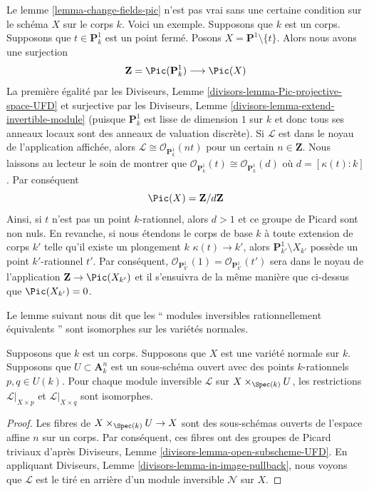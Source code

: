 \begin{example}
\label{example-need-condition}
Le lemme \ref{lemma-change-fields-pic} n'est pas vrai sans une certaine
condition sur le schéma $X$ sur le corps $k$. Voici un exemple. Supposons
que $k$ est un corps. Supposons que $t \in \mathbf{P}^1_k$ est un point
fermé. Posons $X = \mathbf{P}^1 \setminus \{t\}$. Alors nous avons une surjection
$$
\mathbf{Z} = \Pic(\mathbf{P}^1_k) \longrightarrow \Pic(X)
$$
La première égalité par les Diviseurs, Lemme
\ref{divisors-lemma-Pic-projective-space-UFD} et
surjective par les Diviseurs, Lemme
\ref{divisors-lemma-extend-invertible-module} (puisque
$\mathbf{P}^1_k$ est lisse de dimension $1$ sur $k$ et
donc tous ses anneaux locaux sont des anneaux de
valuation discrète). Si $\mathcal{L}$ est dans le noyau
de l'application affichée, alors $\mathcal{L} \cong
\mathcal{O}_{\mathbf{P}^1_k}(nt)$ pour un certain $n \in
\mathbf{Z}$. Nous laissons au lecteur le soin de montrer
que $\mathcal{O}_{\mathbf{P}^1_k}(t) \cong
\mathcal{O}_{\mathbf{P}^1_k}(d)$ où $d = [\kappa(t) : k]$. Par conséquent
$$
\Pic(X) = \mathbf{Z}/d\mathbf{Z}
$$
Ainsi, si $t$ n'est pas un point $k$-rationnel, alors
$d > 1$ et ce groupe de Picard sont non nuls. En
revanche, si nous étendons le corps de base $k$ à toute
extension de corps $k'$ telle qu'il existe un plongement
$k$ $\kappa(t) \to k'$, alors $\mathbf{P}^1_{k'}
\setminus X_{k'}$ possède un point $k'$-rationnel $t'$.
Par conséquent, $\mathcal{O}_{\mathbf{P}^1_{k'}}(1) =
\mathcal{O}_{\mathbf{P}^1_{k'}}(t')$ sera dans le noyau de
l'application $\mathbf{Z} \to \Pic(X_{k'})$ et il
s'ensuivra de la même manière que ci-dessus que $\Pic(X_{k'}) = 0$.
\end{example}

\noindent
Le lemme suivant nous dit que les `` modules inversibles
rationnellement équivalents '' sont isomorphes sur les variétés normales.

\begin{lemma}
\label{lemma-rational-equivalence-for-Pic}
Supposons que $k$ est un corps. Supposons que $X$ est une
variété normale sur $k$. Supposons que $U \subset
\mathbf{A}^n_k$ est un sous-schéma ouvert avec des points
$k$-rationnels $p, q \in U(k)$. Pour chaque module inversible
$\mathcal{L}$ sur $X \times_{\Spec(k)} U$, les restrictions
$\mathcal{L}|_{X \times p}$ et $\mathcal{L}|_{X \times q}$ sont isomorphes.
\end{lemma}

\begin{proof}
Les fibres de $X \times_{\Spec(k)} U \to X$ sont des
sous-schémas ouverts de l'espace affine $n$ sur un corps.
Par conséquent, ces fibres ont des groupes de Picard
triviaux d'après Diviseurs, Lemme
\ref{divisors-lemma-open-subscheme-UFD}. En appliquant Diviseurs,
Lemme \ref{divisors-lemma-in-image-pullback}, nous voyons que
$\mathcal{L}$ est le tiré en arrière d'un module inversible $\mathcal{N}$ sur $X$.
\end{proof}










